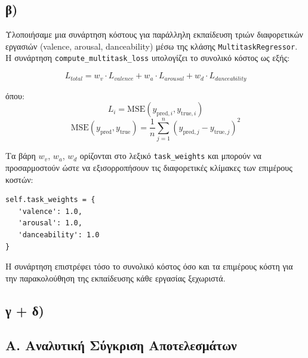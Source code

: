 \documentclass[a4paper,12pt]{article}
\begin{document}
\subsection*{β)}

Υλοποιήσαμε μια συνάρτηση κόστους για παράλληλη εκπαίδευση τριών διαφορετικών εργασιών (valence, arousal, danceability) μέσω της κλάσης \texttt{MultitaskRegressor}. Η συνάρτηση \texttt{compute\_multitask\_loss} υπολογίζει το συνολικό κόστος ως εξής:

\begin{equation}
    L_{total} = w_v \cdot L_{valence} + w_a \cdot L_{arousal} + w_d \cdot L_{danceability}
\end{equation}

όπου:
\[ L_i = \text{MSE}(y_{\text{pred},i}, y_{\text{true},i}) \]
\[ \text{MSE}(y_{\text{pred}}, y_{\text{true}}) = \frac{1}{n}\sum_{j=1}^n (y_{\text{pred},j} - y_{\text{true},j})^2 \]

Τα βάρη \(w_v\), \(w_a\), \(w_d\) ορίζονται στο λεξικό \texttt{task\_weights} και μπορούν να προσαρμοστούν ώστε να εξισορροπήσουν τις διαφορετικές κλίμακες των επιμέρους κοστών:

\begin{verbatim}
self.task_weights = {
   'valence': 1.0,
   'arousal': 1.0,
   'danceability': 1.0
}
\end{verbatim}

Η συνάρτηση επιστρέφει τόσο το συνολικό κόστος όσο και τα επιμέρους κόστη για την παρακολούθηση της εκπαίδευσης κάθε εργασίας ξεχωριστά.

\subsection*{γ + δ)}

\subsection*{Α. Αναλυτική Σύγκριση Αποτελεσμάτων}
\end{document}
